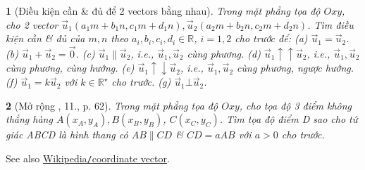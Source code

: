 \documentclass{article}
\newtheorem{baitoan}{}
\begin{document}
\begin{baitoan}[Điều kiện cần \& đủ để 2 vectors bằng nhau]
	Trong mặt phẳng tọa độ $Oxy$, cho 2 vector $\vec{u}_1(a_1m + b_1n,c_1m + d_1n),\vec{u}_2(a_2m + b_2n,c_2m + d_2n)$. Tìm điều kiện cần \& đủ của $m,n$ theo $a_i,b_i,c_i,d_i\in\mathbb{R}$, $i = 1,2$ cho trước để: (a) $\vec{u}_1 = \vec{u}_2$. (b) $\vec{u}_1 + \vec{u}_2 = \vec{0}$. (c) $\vec{u}_1\parallel\vec{u}_2$, i.e., $\vec{u}_1,\vec{u}_2$ cùng phương. (d) $\vec{u}_1\uparrow\uparrow\vec{u}_2$, i.e., $\vec{u}_1,\vec{u}_2$ cùng phương, cùng hướng. (e) $\vec{u}_1\uparrow\downarrow\vec{u}_2$, i.e., $\vec{u}_1,\vec{u}_2$ cùng phương, ngược hướng. (f) $\vec{u}_1 = k\vec{u}_2$ với $k\in\mathbb{R}^\star$ cho trước. (g) $\vec{u}_1\bot\vec{u}_2$.
\end{baitoan}

\begin{baitoan}[Mở rộng \cite{SBT_Toan_10_Canh_Dieu_tap_2}, 11., p. 62]
		Trong mặt phẳng tọa độ $Oxy$, cho tọa độ 3 điểm không thẳng hàng $A(x_A,y_A),B(x_B,y_B)$, $C(x_C,y_C)$. Tìm tọa độ điểm D sao cho tứ giác ABCD là hình thang có $AB\parallel CD$ \& $CD = aAB$ với $a > 0$ cho trước.
\end{baitoan}
See also \href{https://en.wikipedia.org/wiki/Coordinate_vector}{Wikipedia{\tt/}coordinate vector}.

\end{document}
